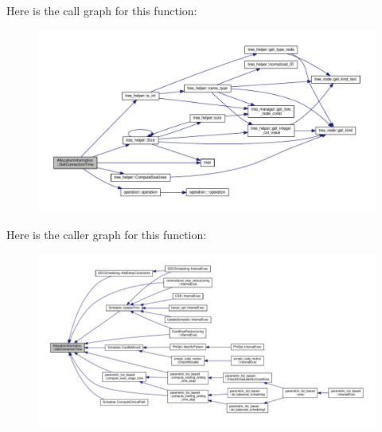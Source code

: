 Here is the call graph for this function\+:
\nopagebreak
\begin{figure}[H]
\begin{center}
\leavevmode
\includegraphics[width=350pt]{d7/d79/classAllocationInformation_ae342b26bfe5993d1580c406ceb3cf9d3_cgraph}
\end{center}
\end{figure}
Here is the caller graph for this function\+:
\nopagebreak
\begin{figure}[H]
\begin{center}
\leavevmode
\includegraphics[width=350pt]{d7/d79/classAllocationInformation_ae342b26bfe5993d1580c406ceb3cf9d3_icgraph}
\end{center}
\end{figure}
\mbox{\label{classAllocationInformation_a22ad03a89978213b6b8d198f04f0ecad}} 
